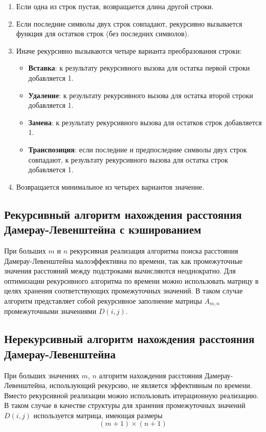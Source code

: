 \begin{enumerate}
    \item Если одна из строк пустая, возвращается длина другой строки.
    \item Если последние символы двух строк совпадают,
    рекурсивно вызы\-вается функция для остатков строк
    (без последних символов).
    \item Иначе рекурсивно вызываются четыре варианта преобразования строки:
    \begin{itemize}
        \item \textbf{Вставка}: к результату рекурсивного вызова для остатка
        первой строки добавляется 1.
        \item \textbf{Удаление}: к результату рекурсивного вызова для остатка
        вто\-рой строки добавляется 1.
        \item \textbf{Замена}: к результату рекурсивного вызова для остатков строк
        добавляется 1.
        \item \textbf{Транспозиция}: если последние и
        предпоследние символы двух строк совпадают,
        к результату рекурсивного вызова для остатка строк
        добавляется 1.
    \end{itemize}
    \item Возвращается минимальное из четырех вариантов значение.
\end{enumerate}


\subsection{Рекурсивный алгоритм нахождения рассто\-яния Дамерау-Левенштейна с кэшировани\-ем}

При больших $m$ и $n$ рекурсивная реализация алгоритма поиска расстояния Дамерау-Левенштейна малоэффективна по времени, так как промежуточные значения расстояний между подстроками вычисляются неоднократно. Для оптимизации рекурсивного алгоритма по времени можно использовать матрицу в целях хранения соответствующих про\-межуточных значений. В таком случае алгоритм представляет собой рекурсивное заполнение матрицы $A_{m,n}$ промежуточными значениями $D(i, j)$.

\subsection{Нерекурсивный алгоритм нахождения рас\-стояния Дамерау-Левенштейна}

При больших значениях $m$, $n$ алгоритм нахождения расстояния Дамерау-Левенштейна, использующий рекурсию, не является эффективным по времени. Вместо рекурсивной реализации можно использовать итерационную реализацию. В таком случае в качестве структуры для хранения промежуточных значений $D(i, j)$ используется матрица, имеющая размеры 
\begin{equation}
    (m + 1) \times (n + 1)
\end{equation}


